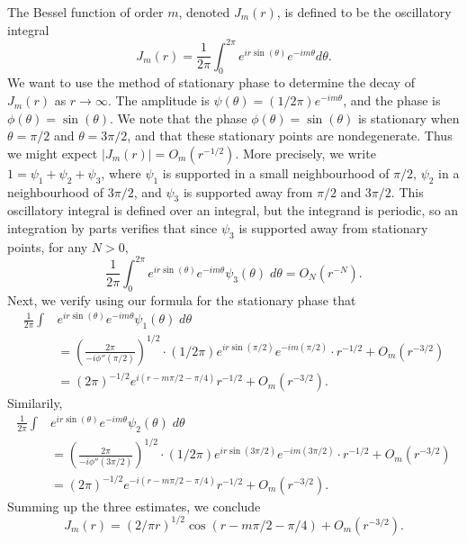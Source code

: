\begin{example}
  The Bessel function of order $m$, denoted $J_m(r)$, is defined to be the oscillatory integral
  \[ J_m(r) = \frac{1}{2\pi} \int_0^{2\pi} e^{i r \sin(\theta)} e^{-i m \theta} d\theta. \]
  We want to use the method of stationary phase to determine the decay of $J_m(r)$ as $r \to \infty$. The amplitude is $\psi(\theta) = (1/2\pi) e^{-im \theta}$, and the phase is $\phi(\theta) = \sin(\theta)$. We note that the phase $\phi(\theta) = \sin(\theta)$ is stationary when $\theta = \pi/2$ and $\theta = 3\pi/2$, and that these stationary points are nondegenerate. Thus we might expect $|J_m(r)| = O_m(r^{-1/2})$. More precisely, we write $1 = \psi_1 + \psi_2 + \psi_3$, where $\psi_1$ is supported in a small neighbourhood of $\pi/2$, $\psi_2$ in a neighbourhood of $3\pi/2$, and $\psi_3$ is supported away from $\pi/2$ and $3\pi/2$. This oscillatory integral is defined over an integral, but the integrand is periodic, so an integration by parts verifies that since $\psi_3$ is supported away from stationary points, for any $N > 0$,
  \[ \frac{1}{2\pi} \int_0^{2\pi} e^{i r \sin(\theta)} e^{-i m \theta} \psi_3(\theta)\; d\theta = O_N(r^{-N}). \]
  Next, we verify using our formula for the stationary phase that
  \begin{align*}
    \frac{1}{2\pi} \int & e^{i r \sin(\theta)} e^{-i m \theta} \psi_1(\theta)\; d\theta\\
    &= \left( \frac{2\pi}{-i \phi''(\pi/2)} \right)^{1/2} \cdot (1/2\pi) e^{i r \sin(\pi/2)} e^{-i m (\pi/2)} \cdot r^{-1/2} + O_m(r^{-3/2})\\
    &= (2\pi)^{-1/2} e^{i(r - m\pi/2 - \pi/4)} r^{-1/2} + O_m(r^{-3/2}).
  \end{align*}
  Similarily,
  \begin{align*}
    \frac{1}{2\pi} \int & e^{i r \sin(\theta)} e^{-i m \theta} \psi_2(\theta)\; d\theta\\
    &= \left( \frac{2\pi}{-i \phi''(3\pi/2)} \right)^{1/2} \cdot (1/2\pi) e^{i r \sin(3\pi/2)} e^{-i m (3\pi/2)} \cdot r^{-1/2} + O_m(r^{-3/2})\\
    &= (2\pi)^{-1/2} e^{-i(r - m\pi/2 - \pi/4)} r^{-1/2} + O_m(r^{-3/2}).
  \end{align*}
  Summing up the three estimates, we conclude
  \[ J_m(r) = (2/\pi r)^{1/2} \cos(r - m\pi/2 - \pi/4) + O_m(r^{-3/2}). \]
\end{example}

